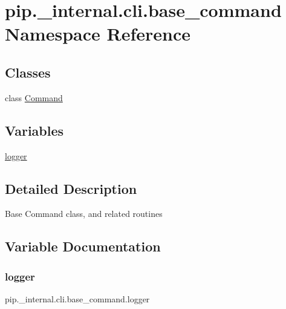 \hypertarget{namespacepip_1_1__internal_1_1cli_1_1base__command}{}\section{pip.\+\_\+internal.\+cli.\+base\+\_\+command Namespace Reference}
\label{namespacepip_1_1__internal_1_1cli_1_1base__command}
\subsection*{Classes}
\begin{DoxyCompactItemize}
\item 
class \hyperlink{classpip_1_1__internal_1_1cli_1_1base__command_1_1Command}{Command}
\end{DoxyCompactItemize}
\subsection*{Variables}
\begin{DoxyCompactItemize}
\item 
\hyperlink{namespacepip_1_1__internal_1_1cli_1_1base__command_a262977b5b57dbf25f1e27b1021389f7d}{logger}
\end{DoxyCompactItemize}


\subsection{Detailed Description}
\begin{DoxyVerb}Base Command class, and related routines\end{DoxyVerb}
 

\subsection{Variable Documentation}
\mbox{\label{namespacepip_1_1__internal_1_1cli_1_1base__command_a262977b5b57dbf25f1e27b1021389f7d}} 
\subsubsection{\texorpdfstring{logger}{logger}}
{\footnotesize\ttfamily pip.\+\_\+internal.\+cli.\+base\+\_\+command.\+logger}

